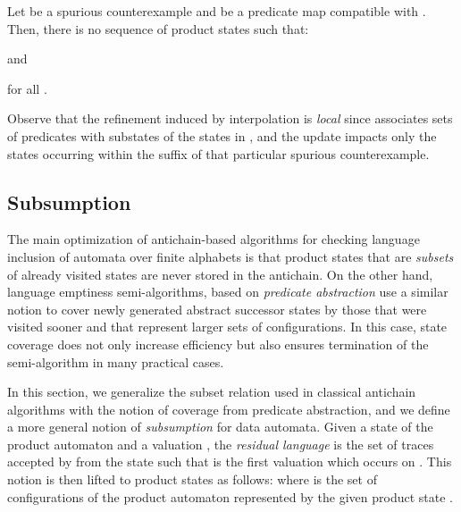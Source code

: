 \documentclass{llncs}
\begin{document}
\begin{lemma}\label{lemma:refinement}
  Let  be a spurious
  counterexample and  be a predicate map compatible with
  . Then, there is no sequence of product states
   such
  that:\begin{inparaenum}[(1)]
  \item  and
  \item  for all
  .
  \end{inparaenum}
\end{lemma}


Observe that the refinement induced by interpolation is \emph{local}
since  associates sets of predicates with substates of the states
in , and the update impacts only
the states occurring within the suffix of that particular spurious
counterexample.

\subsection{Subsumption}


The main optimization of antichain-based algorithms \cite{abdulla}
for checking language inclusion of automata over finite alphabets is
that product states that are \emph{subsets} of already visited states
are never stored in the antichain. On the other hand, language
emptiness semi-algorithms, based on \emph{predicate abstraction}
\cite{mcmillan06} use a similar notion to cover newly generated
abstract successor states by those that were visited sooner and that
represent larger sets of configurations. In this case, state coverage
does not only increase efficiency but also ensures termination of the
semi-algorithm in many practical cases.

In this section, we generalize the subset relation used in classical
antichain algorithms with the notion of coverage from predicate
abstraction, and we define a more general notion of \emph{subsumption}
for data automata. Given a state  of the product
automaton  and a valuation , the \emph{residual language}
 is
the set of traces  accepted by 
from the state  such that  is the first valuation
which occurs on . This notion is then lifted to product states as
follows: 
where  is the set of configurations of the product automaton
 represented by the given product
state .
\end{document}
